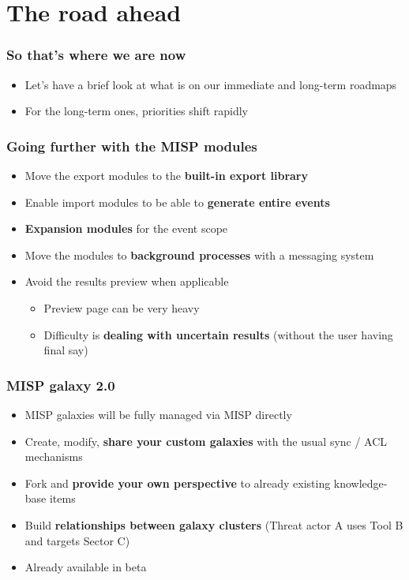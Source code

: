 \section{The road ahead}

\begin{frame}
\frametitle{So that's where we are now}
\begin{itemize}
	\item Let's have a brief look at what is on our immediate and long-term roadmaps
        \item For the long-term ones, priorities shift rapidly
\end{itemize}
\end{frame}

\begin{frame}
\frametitle{Going further with the MISP modules}
\begin{itemize}
    \item Move the export modules to the {\bf built-in export library}
    \item Enable import modules to be able to {\bf generate entire events}
    \item {\bf Expansion modules} for the event scope
\end{itemize}
\begin{itemize}
    \item Move the modules to {\bf background processes} with a
messaging system
    \item Avoid the results preview when applicable
    \begin{itemize}
        \item Preview page can be very heavy
        \item Difficulty is {\bf dealing with uncertain results} (without the user
having final say)
    \end{itemize}
\end{itemize}
\end{frame}

\begin{frame}
\frametitle{MISP galaxy 2.0}
\begin{itemize}
	\item MISP galaxies will be fully managed via MISP directly
        \item Create, modify, {\bf share your custom galaxies} with the usual sync / ACL mechanisms
        \item Fork and {\bf provide your own perspective} to already existing knowledge-base items
        \item Build {\bf relationships between galaxy clusters} (Threat actor A uses Tool B and targets Sector C)
        \item Already available in beta
\end{itemize}
\end{frame}

